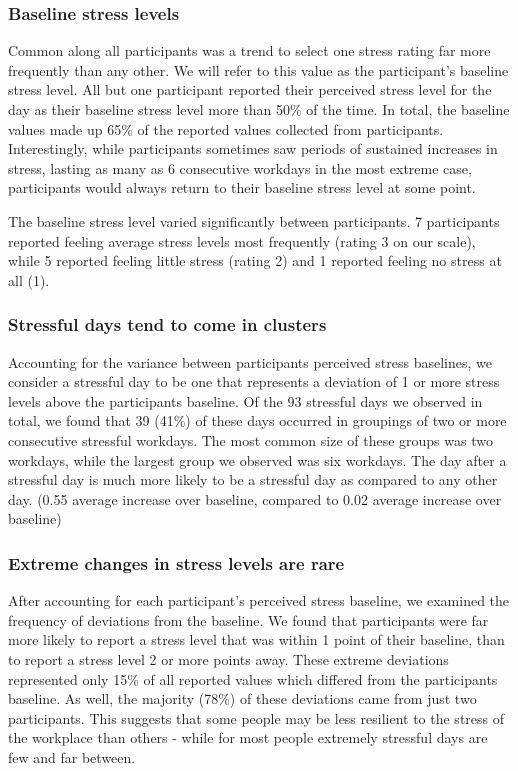 \subsubsection{Baseline stress levels}
Common along all participants was a trend to select one stress rating far more frequently than any other. We will refer to this value as the participant's baseline stress level. All but one participant reported their perceived stress level for the day as their baseline stress level more than 50\% of the time. In total, the baseline values made up 65\% of the reported values collected from participants. Interestingly, while participants sometimes saw periods of sustained increases in stress, lasting as many as 6 consecutive workdays in the most extreme case, participants would always return to their baseline stress level at some point.

The baseline stress level varied significantly between participants. 7 participants reported feeling average stress levels most frequently (rating 3 on our scale), while 5 reported feeling little stress (rating 2) and 1 reported feeling no stress at all (1).

\subsubsection{Stressful days tend to come in clusters}
Accounting for the variance between participants perceived stress baselines, we consider a stressful day to be one that represents a deviation of 1 or more stress levels above the participants baseline. Of the 93 stressful days we observed in total, we found that 39 (41\%) of these days occurred in groupings of two or more consecutive stressful workdays. The most common size of these groups was two workdays, while the largest group we observed was six workdays.
The day after a stressful day is much more likely to be a stressful day as compared to any other day. (0.55 average increase over baseline, compared to 0.02 average increase over baseline)

\subsubsection{Extreme changes in stress levels are rare}
After accounting for each participant's perceived stress baseline, we examined the frequency of deviations from the baseline. We found that participants were far more likely to report a stress level that was within 1 point of their baseline, than to report a stress level 2 or more points away. These extreme deviations represented only 15\% of all reported values which differed from the participants baseline. As well, the majority (78\%) of these deviations came from just two participants. This suggests that some people may be less resilient to the stress of the workplace than others - while for most people extremely stressful days are few and far between.

